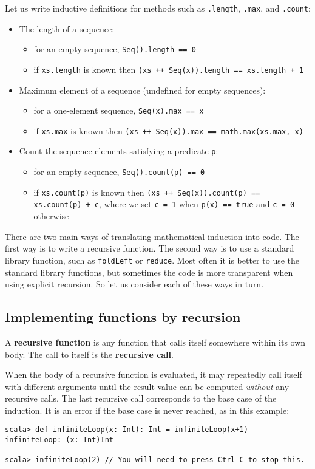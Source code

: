 Let us write inductive definitions for methods such as \lstinline!.length!,
\lstinline!.max!, and \lstinline!.count!:
\begin{itemize}
\item The length of a sequence:
\begin{itemize}
\item for an empty sequence, \lstinline!Seq().length == 0!
\item if \lstinline!xs.length! is known then \lstinline!(xs ++ Seq(x)).length == xs.length + 1!
\end{itemize}
\item Maximum element of a sequence (undefined for empty sequences):
\begin{itemize}
\item for a one-element sequence, \lstinline!Seq(x).max == x! 
\item if \lstinline!xs.max! is known then \lstinline!(xs ++ Seq(x)).max == math.max(xs.max, x)!
\end{itemize}
\item Count the sequence elements satisfying a predicate \lstinline!p!:
\begin{itemize}
\item for an empty sequence, \lstinline!Seq().count(p) == 0!
\item if \lstinline!xs.count(p)! is known then \lstinline!(xs ++ Seq(x)).count(p) == xs.count(p) + c!,
where we set \lstinline!c = 1! when \lstinline!p(x) == true! and
\lstinline!c = 0! otherwise
\end{itemize}
\end{itemize}
There are two main ways of translating mathematical induction into
code. The first way is to write a recursive function. The second way
is to use a standard library function, such as \lstinline!foldLeft!
or \lstinline!reduce!. Most often it is better to use the standard
library functions, but sometimes the code is more transparent when
using explicit recursion. So let us consider each of these ways in
turn.

\subsection{Implementing functions by recursion}

A \textbf{recursive function} is any function
that calls itself somewhere within its own body. The call to itself
is the \textbf{recursive call}.

When the body of a recursive function is evaluated, it may repeatedly
call itself with different arguments until the result value can be
computed \emph{without} any recursive calls. The last recursive call
corresponds to the base case of the induction. It is an error if the
base case is never reached, as in this example:
\begin{lstlisting}
scala> def infiniteLoop(x: Int): Int = infiniteLoop(x+1)
infiniteLoop: (x: Int)Int

scala> infiniteLoop(2) // You will need to press Ctrl-C to stop this.
\end{lstlisting}

